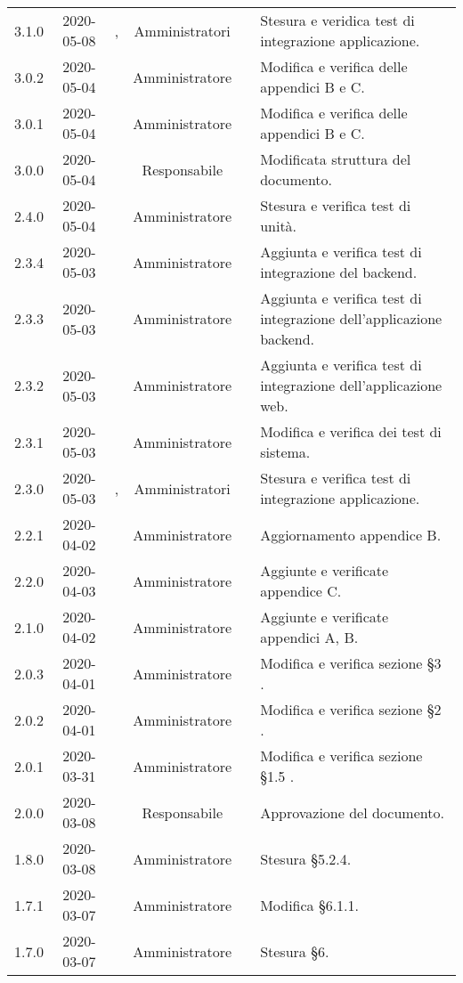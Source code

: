 {\begin{longtable}{ c c  C{2.3cm} c C{3cm} C{3.2cm}}
3.1.0 & 2020-05-08 & \MC{}, \DF{} & Amministratori & \AT{} & Stesura e veridica test di integrazione applicazione. \\
3.0.2 & 2020-05-04 & \PF{} & Amministratore & \AT{} & Modifica e verifica delle appendici B e C. \\
3.0.1 & 2020-05-04 & \PF{} & Amministratore & \AT{} & Modifica e verifica delle appendici B e C. \\
3.0.0 & 2020-05-04 & \DF{} & Responsabile	&		& Modificata struttura del documento.\\
2.4.0 & 2020-05-04 & \PF{} & Amministratore & \AT{} & Stesura e verifica test di unità. \\
2.3.4 & 2020-05-03 & \CE{} & Amministratore & \AT{} & Aggiunta e verifica test di integrazione del backend. \\
2.3.3 & 2020-05-03 & \PF{} & Amministratore & \AT{} & Aggiunta e verifica test di integrazione dell'applicazione backend. \\
2.3.2 & 2020-05-03 & \PF{} & Amministratore & \AT{} & Aggiunta e verifica test di integrazione dell'applicazione web. \\
2.3.1 & 2020-05-03 & \MC{} & Amministratore & \AT{} & Modifica e verifica dei test di sistema. \\
2.3.0 & 2020-05-03 & \MC{}, \DF{} & Amministratori & \AT{} & Stesura e verifica test di integrazione applicazione. \\
2.2.1 & 2020-04-02 & \PF{} & Amministratore & \AT{} & Aggiornamento appendice B.\\
2.2.0 & 2020-04-03 & \PF{} & Amministratore & \AT{} & Aggiunte e verificate appendice C.\\
2.1.0 & 2020-04-02 & \PF{} & Amministratore & \AT{} & Aggiunte e verificate appendici A, B.\\
2.0.3 & 2020-04-01 & \PF{} & Amministratore & \AT{} & Modifica e verifica sezione §3 .\\
2.0.2 & 2020-04-01 & \PF{} & Amministratore & \AT{} & Modifica e verifica sezione §2 .\\
2.0.1 & 2020-03-31 & \PF{} & Amministratore & \AT{} & Modifica e verifica sezione §1.5 .\\
2.0.0 & 2020-03-08 & \BR{} & Responsabile & \DF{}& Approvazione del documento. \\
1.8.0 & 2020-03-08 & \PF{} & Amministratore & \AT{} & Stesura §5.2.4. \\
1.7.1 & 2020-03-07 & \DF{} & Amministratore & \SE{} & Modifica §6.1.1. \\
1.7.0 & 2020-03-07 & \CE{} & Amministratore & \SE{} & Stesura §6. \\

\end{longtable}}
